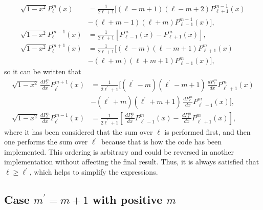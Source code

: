 \begin{align}
    \sqrt{1-x^2} P_{\ell}^{m} (x) &= \frac{1}{2\ell +1}[ (\ell-m+1)(\ell-m+2)P_{\ell+1}^{m-1}(x) \nonumber\\
    &-(\ell+m-1)(\ell+m)P_{\ell-1}^{m-1}(x)], \\
    \sqrt{1-x^2} P_{\ell}^{m-1} (x) &= \frac{1}{2\ell +1}\left[ P_{\ell-1}^{m}(x)-P_{\ell+1}^{m}(x)\right], \\
    \sqrt{1-x^2} P_{\ell}^{m+1} (x) &= \frac{1}{2\ell +1}[ (\ell-m)(\ell-m+1)P_{\ell+1}^{m}(x) \nonumber\\
    &-(\ell+m)(\ell+m+1)P_{\ell-1}^{m}(x)],
\end{align}
so it can be written that
\begin{align}
    \sqrt{1-x^2} \,\frac{dP_{\ell}^{m}}{dx} P_{\ell^{\prime}}^{m+1} (x) &= \frac{1}{2\ell^{\prime} +1}[ (\ell^{\prime}-m)(\ell^{\prime}-m+1)\,\frac{dP_{\ell}^{m}}{dx} P_{\ell^{\prime}+1}^{m}(x) \nonumber\\
    &-(\ell^{\prime}+m)(\ell^{\prime}+m+1)\,\frac{dP_{\ell}^{m}}{dx} P_{\ell^{\prime}-1}^{m}(x)], \\
    \sqrt{1-x^2} \,\frac{dP_{\ell}^{m}}{dx} P_{\ell^{\prime}}^{m-1} (x) &= \frac{1}{2\ell^{\prime} +1}\left[ \,\frac{dP_{\ell}^{m}}{dx}P_{\ell^{\prime}-1}^{m}(x)-\,\frac{dP_{\ell}^{m}}{dx}P_{\ell^{\prime}+1}^{m}(x)\right], 
\end{align}
where it has been considered that the sum over $\ell$ is performed first, and then one performs the sum over $\ell^{\prime}$ because that is how the code has been implemented. This ordering is arbitrary and could be reversed in another implementation without affecting the final result. Thus, it is always satisfied that $\ell \ge \ell^{\prime}$, which helps to simplify the expressions.

\subsection{Case $m^{\prime}= m +1$ with positive $m$}

